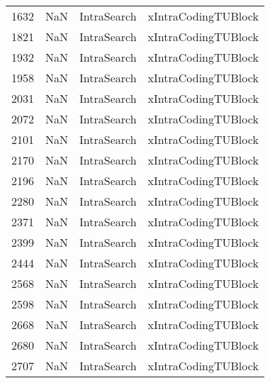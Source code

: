 \begin{tabular}{llll}
1632 &                   NaN &                IntraSearch &                       xIntraCodingTUBlock \\
1821 &                   NaN &                IntraSearch &                       xIntraCodingTUBlock \\
1932 &                   NaN &                IntraSearch &                       xIntraCodingTUBlock \\
1958 &                   NaN &                IntraSearch &                       xIntraCodingTUBlock \\
2031 &                   NaN &                IntraSearch &                       xIntraCodingTUBlock \\
2072 &                   NaN &                IntraSearch &                       xIntraCodingTUBlock \\
2101 &                   NaN &                IntraSearch &                       xIntraCodingTUBlock \\
2170 &                   NaN &                IntraSearch &                       xIntraCodingTUBlock \\
2196 &                   NaN &                IntraSearch &                       xIntraCodingTUBlock \\
2280 &                   NaN &                IntraSearch &                       xIntraCodingTUBlock \\
2371 &                   NaN &                IntraSearch &                       xIntraCodingTUBlock \\
2399 &                   NaN &                IntraSearch &                       xIntraCodingTUBlock \\
2444 &                   NaN &                IntraSearch &                       xIntraCodingTUBlock \\
2568 &                   NaN &                IntraSearch &                       xIntraCodingTUBlock \\
2598 &                   NaN &                IntraSearch &                       xIntraCodingTUBlock \\
2668 &                   NaN &                IntraSearch &                       xIntraCodingTUBlock \\
2680 &                   NaN &                IntraSearch &                       xIntraCodingTUBlock \\
2707 &                   NaN &                IntraSearch &                       xIntraCodingTUBlock \\

\end{tabular}
